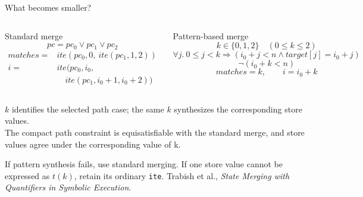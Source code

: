 \documentclass[english,aspectratio=169,t]{beamer}
\newcommand{\sourcefoot}[1]{\vfill\tiny\color{gray}#1}
\begin{document}
\begin{frame}{What becomes smaller?}
  \begin{columns}[T,onlytextwidth]
      \begin{block}{Standard merge}
        {\scriptsize
        \[
          pc=pc_0\lor pc_1\lor pc_2
        \]
        \[
        \begin{aligned}
          matches={}&ite(pc_0,0,\ ite(pc_1,1,2))\\[0.25em]
          i={}&ite(pc_0,i_0,\\
              &\quad ite(pc_1,i_0+1,i_0+2))
        \end{aligned}
        \]
        }
      \end{block}
      \begin{block}{Pattern-based merge}
        {\scriptsize
        \[
          k\in\{0,1,2\}\quad(0\le k\le2)
        \]
        \[
          \forall j.\ 0\le j<k \Rightarrow
          (i_0+j<n\land target[j]=i_0+j)
        \]
        \[
          \neg(i_0+k<n)
        \]
        \[
          matches=k,\qquad i=i_0+k
        \]
        }
      \end{block}
  \end{columns}

  \vspace{-0.35em}
  \begin{center}
    \small
    $k$ identifies the selected path case; the same $k$ synthesizes the corresponding store values.\\[0.15em]
    The compact path constraint is equisatisfiable with the standard merge, and store values agree under the corresponding value of k.
  \end{center}

  \vspace{-0.55em}
  {\scriptsize If pattern synthesis fails, use standard merging. If one store value cannot be expressed as $t(k)$, retain its ordinary \texttt{ite}.}
  \sourcefoot{Trabish et al., \emph{State Merging with Quantifiers in Symbolic Execution}.}
\end{frame}
\end{document}
